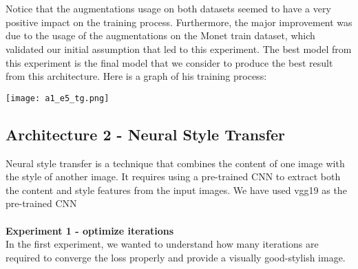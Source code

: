 \documentclass{article}
\begin{document}
\begin{table}[!ht]
    \centering
\end{table}
\\\\
Notice that the augmentations usage on both datasets seemed to have a very positive impact on the training process. Furthermore, the major improvement was due to the usage of the augmentations on the Monet train dataset, which validated our initial assumption that led to this experiment. The best model from this experiment is the final model that we consider to produce the best result from this architecture. Here is a graph of his training process:

\begin{center}
    \texttt{[image: a1\_e5\_tg.png]}
\end{center}

\subsection{Architecture 2 - Neural Style Transfer}
Neural style transfer is a technique that combines the content of one image with the style of another image. It requires using a pre-trained CNN to extract both the content and style features from the input images. We have used vgg19 as the pre-trained CNN
\\\\
\newblock
\textbf{Experiment 1 - optimize iterations}
\\
In the first experiment, we wanted to understand how many iterations are required to converge the loss properly and provide a visually good-stylish image.
\end{document}
